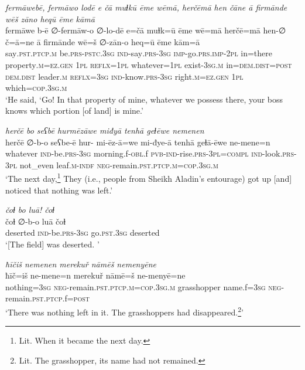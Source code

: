 \ea \label{PM.20}
\textit{fermāwebē, fermāwo lodē e čā muɫkū ēme wēmā, herčēmā hen čāne ā firmānde wēš zāno heqū ēme kāmā} \\ 
\gll fermāwe b-ē ∅-fermāw-o ∅-lo-dē e=čā muɫk=ū ēme wē=mā herčē=mā hen-∅ č=ā=ne ā firmānde wē=š ∅-zān-o heq=ū ēme kām=ā \\ 
 say\textsc{.pst}\textsc{.ptcp}\textsc{.m} be\textsc{.prs}\textsc{-pstc}\textsc{.3sg} \textsc{ind-}say\textsc{.prs}\textsc{-3sg} \textsc{imp-}go\textsc{.prs}.\textsc{imp-}\textsc{2pl} in=there property\textsc{.m}\textsc{\textsc{=ez.gen}} \textsc{1pl} \textsc{reflx}\textsc{=1pl} whatever\textsc{=1pl} exist\textsc{-3sg}\textsc{.m} in=\textsc{dem.dist}\textsc{=\textsc{post}} \textsc{dem.dist} leader\textsc{.m} \textsc{reflx}\textsc{=3sg} \textsc{ind-}know\textsc{.prs}\textsc{-3sg} right\textsc{.m}\textsc{\textsc{=ez.gen}} \textsc{1pl} which\textsc{=cop}\textsc{.3sg}\textsc{.m} \\ 
\glt `He said, ‘Go! In that property of mine, whatever we possess there, your boss knows which portion [of land] is mine.'
\z 
 
\ea \label{PM.24}
\textit{herčē bo seʕbē hurmēzāwe miđyā tenhā geɫēwe nemenen} \\ 
\gll herčē ∅-b-o seʕbe-ē hur- mi-ēz-ā=we mi-đye-ā tenhā geɫā-ēwe ne-mene=n \\ 
 whatever \textsc{ind-}be\textsc{.prs}\textsc{-3sg} morning.f\textsc{-obl}.f \textsc{pvb-}\textsc{ind-}rise\textsc{.prs}\textsc{-3pl}\textsc{=compl} \textsc{ind-}look\textsc{.prs}\textsc{-3pl} not\_even leaf\textsc{.m}\textsc{-indf} \textsc{neg-}remain\textsc{.pst}\textsc{.ptcp}\textsc{.m}\textsc{=cop}\textsc{.3sg}\textsc{.m} \\ 
\glt `The next day,\footnote{Lit. When it became the next day.} They (i.e., people from Sheikh Aladin’s entourage) got up [and] noticed that nothing was left.'
\z 
 
\ea \label{PM.25}
\textit{čoɫ bo luā! čoɫ} \\ 
\gll čoɫ ∅-b-o luā čoɫ \\ 
 deserted \textsc{ind-}be\textsc{.prs}\textsc{-3sg} go\textsc{.pst}\textsc{.3sg} deserted \\ 
\glt `[The field] was deserted. '
\z 
 
\ea \label{PM.26}
\textit{ħīčiš nemenen merekuř nāmēš nemenyēne} \\ 
\gll ħīč=iš ne-mene=n merekuř nāmē=š ne-menyē=ne \\ 
 nothing\textsc{=3sg} \textsc{neg-}remain\textsc{.pst}\textsc{.ptcp}\textsc{.m}\textsc{=cop}\textsc{.3sg}\textsc{.m} grasshopper name.f\textsc{=3sg} \textsc{neg-}remain\textsc{.pst}\textsc{.ptcp}.f\textsc{=\textsc{post}} \\ 
\glt `There was nothing left in it. The grasshoppers had disappeared.\footnote{Lit. The grasshopper, its name had not remained.}'
\z 
 
